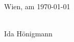 \documentclass[a4paper,11pt,bibliography=totoc,listof=totoc,headinclude=true,cleardoublepage=empty,oneside]{scrbook}
\begin{document}
\vspace*{3cm}

\noindent
Wien, am \today
%
\hfill 
%
\begin{minipage}[t]{5cm}
\centering
\underline{\hspace*{5cm}}\\
\small Ida Hönigmann
\end{minipage}

\cleardoublepage


\tableofcontents

\cleardoublepage
{} 



\printbibliography
\end{document}
